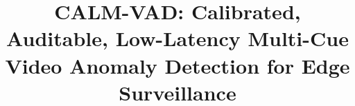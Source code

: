\documentclass[conference]{IEEEtran}
\newif\ifdraftmode
\newcommand{\pend}[1]{\textcolor{blue!60!black}{#1}}
\newcommand{\pend}[1]{#1}
\newcommand{\method}{CALM-VAD}
\begin{document}
\title{\method{}: Calibrated, Auditable, Low-Latency Multi-Cue\\
Video Anomaly Detection for Edge Surveillance}

\author{
}

\maketitle

\ifdraftmode
\begin{center}
\fbox{\parbox{0.94\columnwidth}{\footnotesize\textcolor{red!70!black}{%
\textbf{WORKING DRAFT.} Method, protocol and analysis are complete; the
quantitative tables are populated by the released evaluation harness
(\texttt{calm/harness.py}) and are marked \pend{pending}. Set
\texttt{\textbackslash draftmodefalse} to hide this notice and the TODOs.}}}
\end{center}
\vspace{4pt}
\fi
\end{document}
